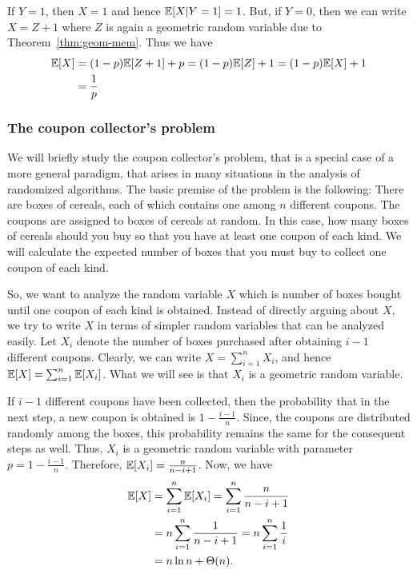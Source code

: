 If $Y=1$, then $X=1$ and hence $\mathbb{E}[X|Y=1] =1$. But, if $Y=0$, then we can write $X = Z+1$ where $Z$ is again a geometric random variable due to Theorem~\ref{thm:geom-mem}. Thus we have
\begin{align*}
	\mathbb{E}[X] &= (1-p)\mathbb{E}[Z+1] + p = (1-p)\mathbb{E}[Z] + 1 = (1-p)\mathbb{E}[X] +1\\
	&=\frac{1}{p}
\end{align*}

\subsubsection{The coupon collector's problem}

We will briefly study the coupon collector's problem, that is a special case of a more general paradigm, that arises in many situations in the analysis of randomized algorithms. The basic premise of the problem is the following: There are boxes of cereals, each of which contains one among $n$ different coupons. The coupons are assigned to boxes of cereals at random. In this case, how many boxes of cereals should you buy so that you have at least one coupon of each kind. We will calculate the expected number of boxes that you must buy to collect one coupon of each kind.

So, we want to analyze the random variable $X$ which is number of boxes bought until one coupon of each kind is obtained. Instead of directly arguing about $X$, we try to write $X$ in terms of simpler random variables that can be analyzed easily. Let $X_i$ denote the number of boxes purchased after obtaining $i-1$ different coupons. Clearly, we can write $X = \sum_{i=1}^{n} X_i$, and hence $\mathbb{E}[X] = \sum_{i=1}^n \mathbb{E}[X_i]$. What we will see is that $X_i$ is a geometric random variable.

If $i-1$ different coupons have been collected, then the probability that in the next step, a new coupon is obtained is $1-\frac{i-1}{n}$. Since, the coupons are distributed randomly among the boxes, this probability remains the same for the consequent steps as well. Thus, $X_i$ is a geometric random variable with parameter $p = 1 - \frac{i-1}{n}$. Therefore, $\mathbb{E}[X_i] = \frac{n}{n-i+1}$. Now, we have
\begin{align*}
	\mathbb{E}[X] &= \sum_{i=1}^n \mathbb{E}[X_i] = \sum_{i=1}^n \frac{n}{n-i+1}\\
	&= n \sum_{i=1}^n \frac{1}{n-i+1} = n\sum_{i=1}^n \frac{1}{i}\\
	&= n\ln n+ \Theta(n).
\end{align*}

